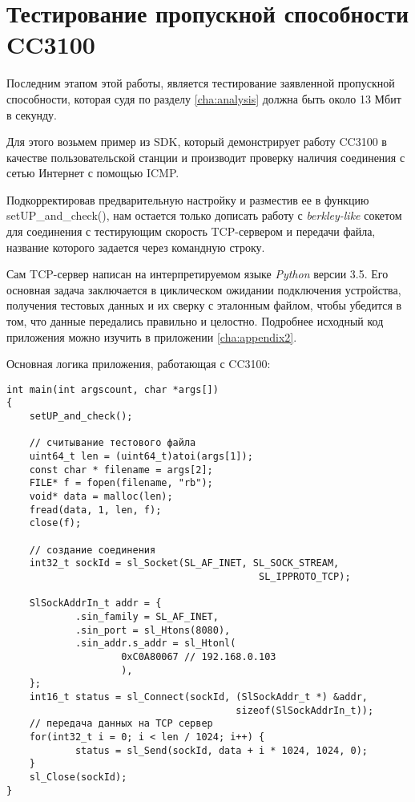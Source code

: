 \chapter{Тестирование пропускной способности CC3100}
\label{cha:impl}

Последним этапом этой работы, является тестирование
заявленной пропускной способности, которая судя по
разделу \ref{cha:analysis} должна быть около 13 Мбит в секунду.

Для этого возьмем пример из SDK, который демонстрирует
работу CC3100 в качестве пользовательской станции и производит
проверку наличия соединения с сетью Интернет с помощью ICMP\cite{icmp}.

Подкорректировав предварительную настройку и разместив ее в
функцию \textmd{setUP\_and\_check()}, нам остается только дописать
работу с \textit{berkley-like} сокетом для соединения с
тестирующим скорость TCP-сервером и передачи файла, название
которого задается через командную строку.

Сам TCP-сервер написан на интерпретируемом языке \textit{Python}
версии 3.5. Его основная задача заключается в циклическом
ожидании подключения устройства, получения тестовых данных
и их сверку с эталонным файлом, чтобы убедится в том, что
данные передались правильно и целостно. Подробнее
исходный код приложения можно изучить в приложении \ref{cha:appendix2}.

\clearpage
Основная логика приложения, работающая с CC3100:

\begin{verbatim}
int main(int argscount, char *args[])
{
    setUP_and_check();

    // считывание тестового файла
    uint64_t len = (uint64_t)atoi(args[1]);
    const char * filename = args[2];
    FILE* f = fopen(filename, "rb");
    void* data = malloc(len);
    fread(data, 1, len, f);
    close(f);

    // создание соединения
    int32_t sockId = sl_Socket(SL_AF_INET, SL_SOCK_STREAM,
                                            SL_IPPROTO_TCP);

    SlSockAddrIn_t addr = {
            .sin_family = SL_AF_INET,
            .sin_port = sl_Htons(8080),
            .sin_addr.s_addr = sl_Htonl(
                    0xC0A80067 // 192.168.0.103
                    ),
    };
    int16_t status = sl_Connect(sockId, (SlSockAddr_t *) &addr,
                                        sizeof(SlSockAddrIn_t));
    // передача данных на TCP сервер
    for(int32_t i = 0; i < len / 1024; i++) {
            status = sl_Send(sockId, data + i * 1024, 1024, 0);
    }
    sl_Close(sockId);
}
\end{verbatim}



